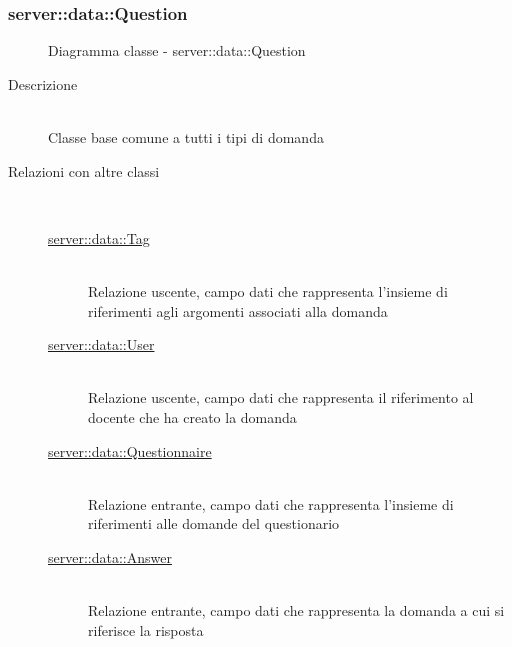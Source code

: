 \vspace{0.5cm}
\hypertarget{server::data::Question}{}
\subsubsection[Question]{server::data::Question}
\begin{figure}[H]
	\centering
	\caption{Diagramma classe - server::data::Question}
\end{figure}\begin{description}
\item[Descrizione] \hfill \\
Classe base comune a tutti i tipi di domanda
\item[Relazioni con altre classi] \hfill \\
\vspace{-7mm}
\begin{description}
	\item[\hyperlink{server::data::Tag}{server::data::Tag}] \hfill \\
	Relazione uscente, campo dati che rappresenta l'insieme di riferimenti agli argomenti associati alla domanda
	\item[\hyperlink{server::data::User}{server::data::User}] \hfill \\
	Relazione uscente, campo dati che rappresenta il riferimento al docente che ha creato la domanda
	\item[\hyperlink{server::data::Questionnaire}{server::data::Questionnaire}] \hfill \\
	Relazione entrante, campo dati che rappresenta l'insieme di riferimenti alle domande del questionario
	\item[\hyperlink{server::data::Answer}{server::data::Answer}] \hfill \\
	Relazione entrante, campo dati che rappresenta la domanda a cui si riferisce la risposta
\end{description}


\end{description}
